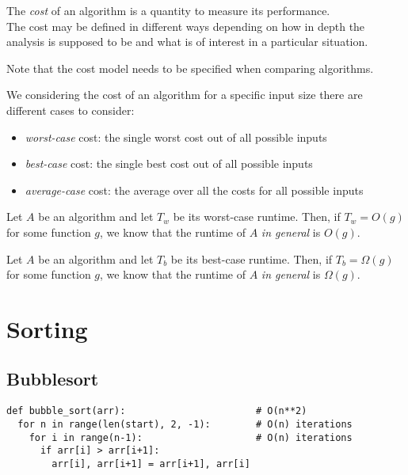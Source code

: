 \documentclass{article}
\begin{document}
\begin{definition}
	The \emph{cost} of an algorithm is a quantity to measure its performance.\\
	The cost may be defined in different ways depending on
	how in depth the analysis is supposed to be and what
	is of interest in a particular situation.
\end{definition}
Note that the cost model needs to be specified when comparing algorithms.
\begin{definition}
	We considering the cost of an algorithm for a specific input size there are different cases to consider:
	\begin{itemize}
		\item \emph{worst-case} cost: the single worst cost out of all possible inputs
		\item \emph{best-case} cost: the single best cost out of all possible inputs
		\item \emph{average-case} cost: the average over all the costs for all possible inputs
	\end{itemize}
\end{definition}
\begin{theorem}
	Let $A$ be an algorithm and let $T_w$ be its worst-case runtime. Then, if $T_w=O(g)$ for some function $g$,
	we know that the runtime of $A$ \emph{in general} is $O(g)$.
\end{theorem}
\begin{theorem}
	Let $A$ be an algorithm and let $T_b$ be its best-case runtime. Then, if $T_b=\Omega(g)$ for some function $g$,
	we know that the runtime of $A$ \emph{in general} is $\Omega (g)$.
\end{theorem}

\section{Sorting}

\subsection{Bubblesort}

\begin{verbatim}
def bubble_sort(arr):                       # O(n**2)
  for n in range(len(start), 2, -1):        # O(n) iterations 
    for i in range(n-1):                    # O(n) iterations
      if arr[i] > arr[i+1]:
        arr[i], arr[i+1] = arr[i+1], arr[i]
\end{verbatim}
\end{document}
